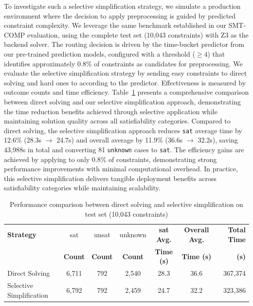 To investigate such a selective simplification strategy, we simulate a production environment where the decision to apply \tool{} preprocessing is guided by predicted constraint complexity. We leverage the same \QFNIA{} benchmark established in our SMT-COMP evaluation, using the complete test set (10,043 constraints) with Z3 as the backend solver. The routing decision is driven by the time-bucket predictor from our pre-trained prediction models, configured with a threshold ($\geq 4$) that identifies approximately 0.8\% of constraints as candidates for \tool{} preprocessing.
We evaluate the selective simplification strategy by sending easy constraints to direct solving and hard ones to \tool{} according to the predictor. Effectiveness is measured by outcome counts and time efficiency.
Table~\ref{tab:routing-performance} presents a comprehensive comparison between direct solving and our selective simplification approach, demonstrating the time reduction benefits achieved through selective \tool application while maintaining solution quality across all satisfiability categories.
Compared to direct solving, the selective simplification approach reduces \texttt{sat} average time by 12.6\% (28.3s $\to$ 24.7s) and overall average by 11.9\% (36.6s $\to$ 32.2s), saving 43,988s in total and converting 81 \texttt{unknown} cases to \texttt{sat}. The efficiency gains are achieved by applying \tool{} to only 0.8\% of constraints, demonstrating strong performance improvements with minimal computational overhead. In practice, this selective simplification delivers tangible deployment benefits across satisfiability categories while maintaining scalability. 
\begin{table}[b]
\centering
\caption{Performance comparison between direct solving and selective simplification on \QFNIA{} test set (10,043 constraints)}
\label{tab:routing-performance}
\normalsize
\begin{tabular}{p{2.2cm}cccccr}
\toprule
\textbf{Strategy} & sat & unsat & unknown & \textbf{sat Avg.} & \textbf{Overall Avg.} & \textbf{Total Time} \\
 & \textbf{Count} & \textbf{Count} & \textbf{Count} & \textbf{Time (s)} & \textbf{Time (s)} & \textbf{(s)} \\
\midrule
Direct Solving & 6,711 & 792 & 2,540 & 28.3 & 36.6 & 367,374 \\
Selective Simplification & 6,792 & 792 & 2,459 & 24.7 & 32.2 & 323,386 \\
\bottomrule
\end{tabular}
\end{table}




